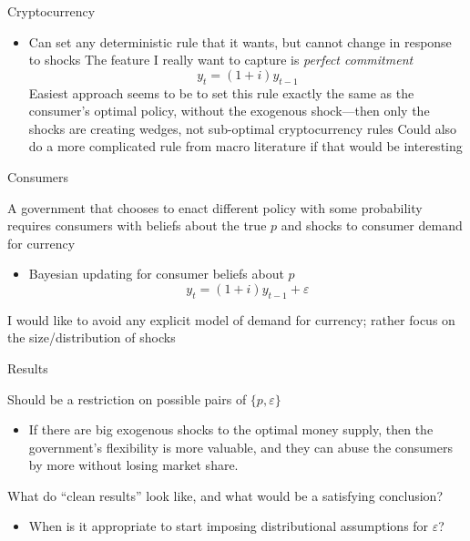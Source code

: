 \documentclass[dvipsnames]{beamer}
\begin{document}
%
%
\begin{frame}{Cryptocurrency}
  \begin{itemize}
  \item Can set any deterministic rule that it wants, but cannot change in response to shocks
    \vitem The feature I really want to capture is \emph{perfect commitment}
    \[
y_t = (1 + i) y_{t - 1}
\]
\vitem Easiest approach seems to be to set this rule exactly the same as the consumer's optimal policy, without the exogenous shock---then only the shocks are creating wedges, not sub-optimal cryptocurrency rules
\vitem Could also do a more complicated rule from macro literature if that would be interesting
  \end{itemize}
\end{frame}
%
\begin{frame}{Consumers}
  \begin{itemize}
    \vitem A government that chooses to enact different policy with some probability requires consumers with beliefs about the true $p$ and shocks to consumer demand for currency
    \begin{itemize}
    \item Bayesian updating for consumer beliefs about $p$
      \[
y_t = (1 + i) y_{t - 1} + \varepsilon
      \]
    \end{itemize}
    \vitem I would like to avoid any explicit model of demand for currency; rather focus on the size/distribution of shocks
  \end{itemize}
\end{frame}
%
\begin{frame}{Results}
  \begin{itemize}
    \vitem Should be a restriction on possible pairs of $\{p, \varepsilon\}$
    \begin{itemize}
    \item If there are big exogenous shocks to the optimal money supply, then the government's flexibility is more valuable, and they can abuse the consumers by more without losing market share.
    \end{itemize}
    \vitem What do ``clean results'' look like, and what would be a satisfying conclusion?
    \begin{itemize}
    \item When is it appropriate to start imposing distributional assumptions for $\varepsilon$?
    \end{itemize}
  \end{itemize}
\end{frame}
\end{document}
